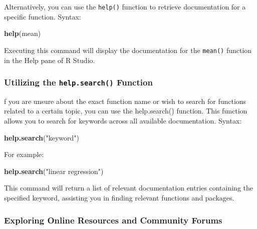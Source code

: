 \documentclass[
]{book}
\newenvironment{Shaded}{\begin{snugshade}}{\end{snugshade}}
\newcommand{\FunctionTok}[1]{\textcolor[rgb]{0.13,0.29,0.53}{\textbf{#1}}}
\newcommand{\NormalTok}[1]{#1}
\newcommand{\StringTok}[1]{\textcolor[rgb]{0.31,0.60,0.02}{#1}}
\begin{document}
Alternatively, you can use the \texttt{help()} function to retrieve documentation for a specific function. Syntax:

\begin{Shaded}
\begin{Highlighting}[]
\FunctionTok{help}\NormalTok{(mean)}
\end{Highlighting}
\end{Shaded}

Executing this command will display the documentation for the \texttt{mean()} function in the Help pane of R Studio.

\hypertarget{utilizing-the-help.search-function}{%
\subsubsection{\texorpdfstring{Utilizing the \texttt{help.search()} Function}{Utilizing the help.search() Function}}\label{utilizing-the-help.search-function}}

f you are unsure about the exact function name or wish to search for functions related to a certain topic, you can use the help.search() function. This function allows you to search for keywords across all available documentation. Syntax:

\begin{Shaded}
\begin{Highlighting}[]
\FunctionTok{help.search}\NormalTok{(}\StringTok{"keyword"}\NormalTok{)}
\end{Highlighting}
\end{Shaded}

For example:

\begin{Shaded}
\begin{Highlighting}[]
\FunctionTok{help.search}\NormalTok{(}\StringTok{"linear regression"}\NormalTok{)}
\end{Highlighting}
\end{Shaded}

This command will return a list of relevant documentation entries containing the specified keyword, assisting you in finding relevant functions and packages.

\hypertarget{exploring-online-resources-and-community-forums}{%
\subsubsection{Exploring Online Resources and Community Forums}\label{exploring-online-resources-and-community-forums}}
\end{document}
